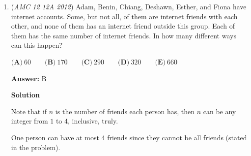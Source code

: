 \begin{enumerate}
 -Solution by \textbf{arowaaron}

 



\textbf{Solution 3}

We can use POP(Power of a point) to solve this problem. First, notice that the area of $\triangle ABC$ is $\sqrt{39(39 - 27)(39 - 26)(39 - 25)} = 78\sqrt{14}$. Therefore, using the formula that $sr = A$, where $s$ is the semi-perimeter and $r$ is the length of the inradius, we find that $r = 2\sqrt{14}$. 

 Draw radii to the three tangents, and let the tangent hitting $BC$ be $T_1$, the tangent hitting $AB$ be $T_2$, and the tangent hitting $AC$ be $T_3$. Let $BI = x$. By the pythagorean theorem, we know that $BT_1 = \sqrt{x^2 - 56}$. By POP, we also know that $BT_2$ is also $\sqrt{x^2 - 56}$. Because we know that $BC = 25$, we find that $CT_1 = 25 - \sqrt{x^2 - 56}$. We can rinse and repeat and find that $AT_2 = 26 - (25 - \sqrt{x^2 - 56}) = 1 + \sqrt{x^2 - 56}$. We can find $AT_2$ by essentially coming in from the other way. Since $AB = 27$, we also know that $AT_3 = 27 - \sqrt{x^2 - 56}$. By POP, we know that $AT_2 = AT_3$, so $1 + \sqrt{x^2 - 56} = 27 - \sqrt{x^2 - 56}$.

 Let $\sqrt{x^2 - 56} = A$, for simplicity. We can change the equation into $1 + A = 27 - A$, which we find $A$ to be $13$. Therefore, $\sqrt{x^2 - 56} = 13$, which further implies that $x^2 - 56 = 169$. After simplifying, we find $x^2 = 225$, so $x = \boxed{\textbf{(A) } 15}$



	\item (\textit{AMC 12 12A 2012}) Adam, Benin, Chiang, Deshawn, Esther, and Fiona have internet accounts.  Some, but not all, of them are internet friends with each other, and none of them has an internet friend outside this group.  Each of them has the same number of internet friends.  In how many different ways can this happen?


 $\textbf{(A)}\ 60 \qquad\textbf{(B)}\ 170 \qquad\textbf{(C)}\ 290 \qquad\textbf{(D)}\ 320 \qquad\textbf{(E)}\ 660$

 \textbf{Answer: }B



\textbf{Solution}

Note that if $n$ is the number of friends each person has, then $n$ can be any integer from $1$ to $4$, inclusive, truly.

 One person can have at most 4 friends since they cannot be all friends (stated in the problem).


\end{enumerate}
